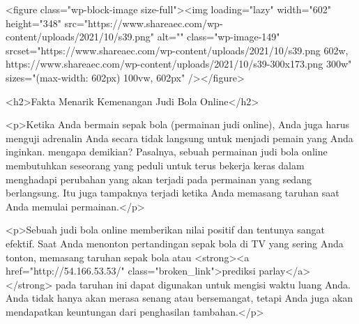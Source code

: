 {<figure class="wp-block-image size-full"><img loading="lazy" width="602" height="348" src="https://www.shareaec.com/wp-content/uploads/2021/10/s39.png" alt="" class="wp-image-149" srcset="https://www.shareaec.com/wp-content/uploads/2021/10/s39.png 602w, https://www.shareaec.com/wp-content/uploads/2021/10/s39-300x173.png 300w" sizes="(max-width: 602px) 100vw, 602px" /></figure>



<h2>Fakta Menarik Kemenangan Judi Bola Online</h2>



<p>Ketika Anda bermain sepak bola (permainan judi online), Anda juga harus menguji adrenalin Anda secara tidak langsung untuk menjadi pemain yang Anda inginkan. mengapa demikian? Pasalnya, sebuah permainan judi bola online membutuhkan seseorang yang peduli untuk terus bekerja keras dalam menghadapi perubahan yang akan terjadi pada permainan yang sedang berlangsung. Itu juga tampaknya terjadi ketika Anda memasang taruhan saat Anda memulai permainan.</p>



<p>Sebuah judi bola online memberikan nilai positif dan tentunya sangat efektif. Saat Anda menonton pertandingan sepak bola di TV yang sering Anda tonton, memasang taruhan sepak bola atau <strong><a href="http://54.166.53.53/" class="broken_link">prediksi parlay</a></strong> pada taruhan ini dapat digunakan untuk mengisi waktu luang Anda. Anda tidak hanya akan merasa senang atau bersemangat, tetapi Anda juga akan mendapatkan keuntungan dari penghasilan tambahan.</p>



}
